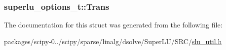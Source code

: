 \subsubsection[{Trans}]{ superlu\+\_\+options\+\_\+t\+::\+Trans}\label{structsuperlu__options__t_a23fa8259c7091d82f10f0dfc7718dc36}


The documentation for this struct was generated from the following file\+:\begin{DoxyCompactItemize}
\item 
packages/scipy-\/0../scipy/sparse/linalg/dsolve/\+Super\+L\+U/\+S\+R\+C/\hyperlink{slu__util_8h}{slu\+\_\+util.\+h}\end{DoxyCompactItemize}
